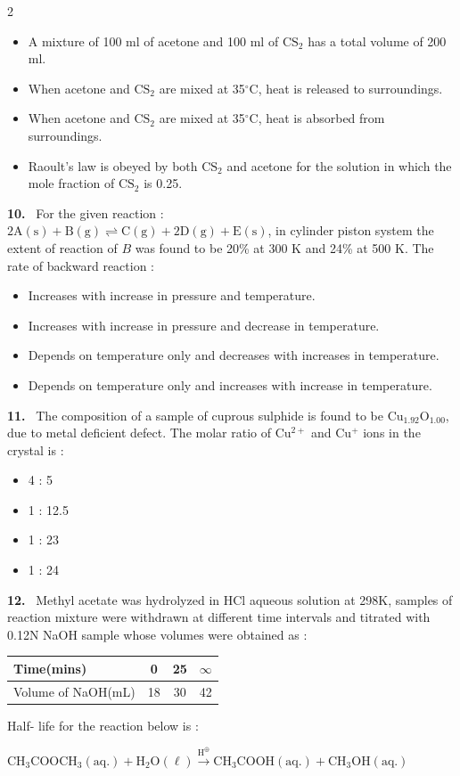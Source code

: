 \documentclass[10pt]{extarticle}
\newcommand{\qn}[1]{\par\smallskip\noindent\textbf{#1.}~}
\newenvironment{qoptions}{\begin{itemize}[leftmargin=1.8em,itemsep=1pt,topsep=2pt,label={}]}{\end{itemize}}
\newcommand{\opt}[2]{\item[(#1)] #2}
\begin{document}
\begin{multicols}{2}
\begin{qoptions}
\opt{A}{A mixture of 100 ml of acetone and 100 ml of $\mathrm{CS_2}$ has a total volume of 200 ml.}
\opt{B}{When acetone and $\mathrm{CS_2}$ are mixed at 35$^\circ$C, heat is released to surroundings.}
\opt{C}{When acetone and $\mathrm{CS_2}$ are mixed at 35$^\circ$C, heat is absorbed from surroundings.}
\opt{D}{Raoult's law is obeyed by both $\mathrm{CS_2}$ and acetone for the solution in which the mole fraction of $\mathrm{CS_2}$ is 0.25.}
\end{qoptions}
\qn{10} For the given reaction :\\
$\mathrm{2A(s)+B(g)\rightleftharpoons C(g)+2D(g)+E(s)}$, in cylinder piston system the extent of reaction of $B$ was found to be 20\% at 300 K and 24\% at 500 K. The rate of backward reaction :
\begin{qoptions}
\opt{A}{Increases with increase in pressure and temperature.}
\opt{B}{Increases with increase in pressure and decrease in temperature.}
\opt{C}{Depends on temperature only and decreases with increases in temperature.}
\opt{D}{Depends on temperature only and increases with increase in temperature.}
\end{qoptions}
\qn{11} The composition of a sample of cuprous sulphide is found to be $\mathrm{Cu_{1.92}O_{1.00}}$, due to metal deficient defect. The molar ratio of $\mathrm{Cu^{2+}}$ and $\mathrm{Cu^+}$ ions in the crystal is :
\begin{qoptions}
\opt{A}{4 : 5}
\opt{B}{1 : 12.5}
\opt{C}{1 : 23}
\opt{D}{1 : 24}
\end{qoptions}
\qn{12} Methyl acetate was hydrolyzed in HCl aqueous solution at 298K, samples of reaction mixture were withdrawn at different time intervals and titrated with 0.12N NaOH sample whose volumes were obtained as :\par\smallskip
{\footnotesize\setlength{\tabcolsep}{4pt}\begin{tabular}{|l|c|c|c|}
\hline
Time(mins) & 0 & 25 & $\infty$\\
\hline
Volume of NaOH(mL) & 18 & 30 & 42\\
\hline
\end{tabular}}\par\smallskip
Half- life for the reaction below is :\\
\par\noindent\hfill{\footnotesize$\mathrm{CH_3COOCH_3(aq.)+H_2O(\ell)}\xrightarrow{\mathrm{H^\oplus}}\mathrm{CH_3COOH(aq.)+CH_3OH(aq.)}$}\hfill\null\par
\begin{qoptions}

\end{qoptions}
\end{multicols}
\end{document}

